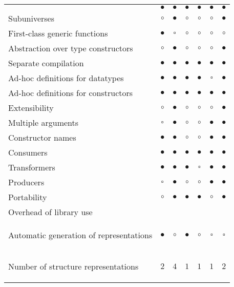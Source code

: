 \documentclass[twocolumn,11pt,a4paper]{article}
\newcommand{\sufficient}{\tiny{$ \square $}}
\begin{document}
\begin{table*}[ht]
\begin{tabular}{l | c c c c c c}
\begin{small}
\end{small} & $ \bullet $ & $ \bullet $ & $ \bullet $ & $ \bullet $ & $ \bullet $ & $ \bullet $ \\
Subuniverses & $ \circ $ & $ \bullet $ & $ \circ $ & $ \circ $ & $ \circ $ & $ \bullet $ \\
\hline
First-class generic functions & $ \bullet $ & \sufficient & $ \circ $ & $ \circ $ & $ \circ $ & $ \circ $ \\
Abstraction over type constructors & $ \circ $ & $ \bullet $ & $ \circ $ & $ \circ $ & $ \circ $ & $ \bullet $ \\
Separate compilation & $ \bullet $ & $ \bullet $ & $ \bullet $ & $ \bullet $ & $ \bullet $ & $ \bullet $ \\
Ad-hoc definitions for datatypes & $ \bullet $ & $ \bullet $ & $ \bullet $ & $ \bullet $ & \sufficient & $ \bullet $ \\
Ad-hoc definitions for constructors & $ \bullet $ & $ \bullet $ & $ \bullet $ & $ \bullet $ & $ \bullet $ & $ \bullet $ \\
Extensibility & $ \circ $ & $ \bullet $ & $ \circ $ & $ \circ $ & $ \circ $ & $ \bullet $ \\
Multiple arguments & \sufficient & $ \bullet $ & $ \circ $ & $ \circ $ & $ \bullet $ & $ \bullet $ \\
Constructor names & $ \bullet $ & $ \bullet $ & $ \circ $ & $ \circ $ & $ \bullet $ & $ \bullet $ \\
Consumers & $ \bullet $ & $ \bullet $ & $ \bullet $ & $ \bullet $ & $ \bullet $ & $ \bullet $ \\
Transformers & $ \bullet $ & $ \bullet $ & $ \bullet $ & \sufficient & $ \bullet $ & $ \bullet $ \\
Producers & \sufficient & $ \bullet $ & $ \circ $ & $ \circ $ & $ \bullet $ & $ \bullet $ \\
\hline
Portability & $ \circ $ & $ \bullet $ & $ \bullet $ & $ \bullet $ & $ \circ $ & $ \bullet $ \\
Overhead of library use & & & & & &  \\
\begin{small}
Automatic generation of representations
\end{small} & $ \bullet $ & $ \circ $ & $ \bullet $ & $ \circ $ & \sufficient & \sufficient \\
\begin{small}
Number of structure representations
\end{small} & $ 2 $ & $ 4 $ & $ 1 $ & $ 1 $ & $ 1 $ & $ 2 $ \\

\end{tabular}
\end{table*}
\end{document}
